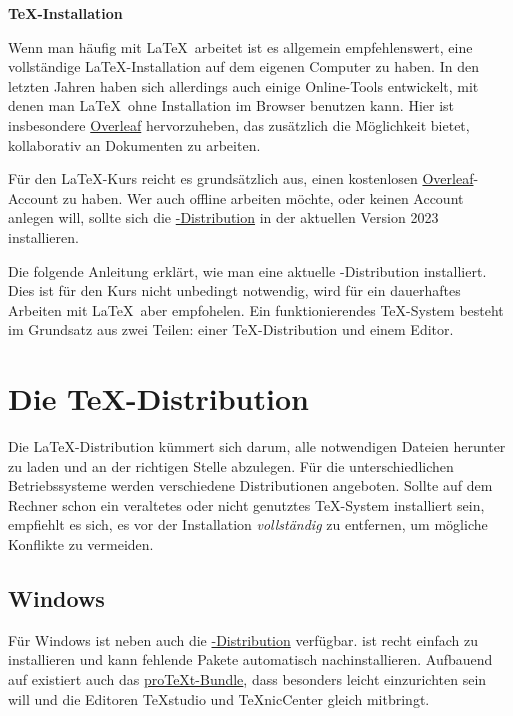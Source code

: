 \documentclass[
	ausgabe=2024-02-12,
	titel=Installationshinweise,
	shortverb=true,
]{../tex/latexkurs-exercise}
\begin{document}
\begin{center}
\sffamily\bfseries\Large \TeX-Installation
\end{center}

\noindent Wenn man häufig mit \LaTeX\ arbeitet ist es allgemein empfehlenswert, eine vollständige \LaTeX-Installation auf dem eigenen Computer zu haben. In den letzten Jahren haben sich allerdings auch einige Online-Tools entwickelt, mit denen man \LaTeX\ ohne Installation im Browser benutzen kann. Hier ist insbesondere \href{https://qn3.de/tex00}{Overleaf} hervorzuheben, das zusätzlich die Möglichkeit bietet, kollaborativ an Dokumenten zu arbeiten.

Für den \LaTeX-Kurs reicht es grundsätzlich aus, einen kostenlosen \href{https://qn3.de/tex00}{Overleaf}-Account zu haben. Wer auch offline arbeiten möchte, oder keinen Account anlegen will, sollte sich die \href{https://www.tug.org/texlive/}{\TeXlive-Distribution} in der aktuellen Version 2023 installieren.

Die folgende Anleitung erklärt, wie man eine aktuelle \TeXlive-Distribution installiert. Dies ist für den Kurs nicht unbedingt notwendig, wird für ein dauerhaftes Arbeiten mit \LaTeX\ aber empfohelen. Ein funktionierendes \TeX-System besteht im Grundsatz aus zwei Teilen: einer \TeX-Distribution und einem Editor.


\section{Die \TeX-Distribution}



Die \LaTeX-Distribution kümmert sich darum, alle notwendigen Dateien herunter zu laden und an der richtigen Stelle abzulegen. Für die unterschiedlichen Betriebssysteme werden verschiedene Distributionen angeboten. Sollte auf dem Rechner schon ein veraltetes oder nicht genutztes \TeX-System installiert sein, empfiehlt es sich, es vor der Installation \emph{vollständig} zu entfernen, um mögliche Konflikte zu vermeiden.

\subsection*{Windows}
Für Windows ist neben \href{https://www.tug.org/texlive/}{\TeXlive} auch die \href{https://miktex.org/}{\MikTeX-Distribution} verfügbar. \MikTeX ist recht einfach zu installieren und kann fehlende Pakete automatisch nachinstallieren. Aufbauend auf \MikTeX existiert auch das \href{https://www.tug.org/protext/}{pro\TeX t-Bundle}, dass besonders leicht einzurichten sein will und die Editoren \TeX studio und \TeX nicCenter gleich mitbringt.
\end{document}

